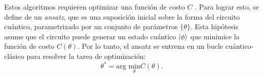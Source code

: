 \documentclass[11pt, spanish, letterpage]{article} %
\begin{document}
Estos algoritmos    requieren optimizar una función de costo $C$ \cite{VQA}. Para lograr esto, se define de un 
\textit{ansatz}, que es una suposición inicial sobre la forma del circuito
cuántico, parametrizado por un conjunto de parámetros $\{\theta\}$. Esta
hipótesis asume que el circuito puede generar un estado cuántico $\ket{\phi}$
que minimice la función de costo $C(\theta)$. Por lo tanto, el ansatz se entrena en un bucle cuántico-clásico para resolver la tarea de optimización:
\begin{equation}
\theta^* = \text{arg }\underset{\theta}{\text{min}} C (\theta).
\end{equation}








\end{document}
